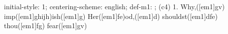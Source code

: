 initial-style: 1;
centering-scheme: english;
def-m1: \grealign;
(c4) 1. Why,([em1]gv) imp([em1]ghijh)ish([em1]g) Her([em1]fe)od,([em1]d) shouldst([em1]dfe) thou([em1]fg) fear([em1]gv)